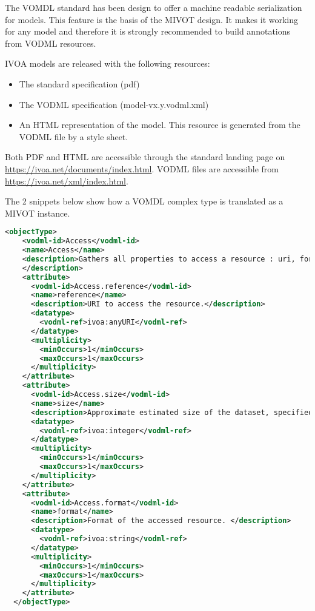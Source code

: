 The VOMDL standard has been design to offer a machine readable serialization for models. 
This feature is the basis of the MIVOT design. 
It makes it working for any model
and therefore it is strongly recommended to build annotations from VODML resources.

IVOA models are released with the following resources:
\begin{itemize}
    \item The standard specification (pdf)
    \item The VODML specification (model-vx.y.vodml.xml)
    \item An HTML representation of the model. 
          This resource is generated from the VODML file by a style sheet.    
\end{itemize}

Both PDF and HTML are accessible through the standard landing page
on \url{https://ivoa.net/documents/index.html}.
VODML files are accessible from \url{https://ivoa.net/xml/index.html}.

The 2 snippets below show how a VOMDL complex type is translated as a MIVOT instance.

\begin{lstlisting}[caption={VODML representation of the PhotDM class \texttt{Access}.
This is an object type with 3 attributes, each with a cardinality equal  to 1. 
At this stage, we do not know whether attributes are typed with a complex types 
or primitive types. This will come later by getting through their own types.},language=XML]
  <objectType>
    <vodml-id>Access</vodml-id>
    <name>Access</name>
    <description>Gathers all properties to access a resource : uri, format and size . 
    </description>
    <attribute>
      <vodml-id>Access.reference</vodml-id>
      <name>reference</name>
      <description>URI to access the resource.</description>
      <datatype>
        <vodml-ref>ivoa:anyURI</vodml-ref>
      </datatype>
      <multiplicity>
        <minOccurs>1</minOccurs>
        <maxOccurs>1</maxOccurs>
      </multiplicity>
    </attribute>
    <attribute>
      <vodml-id>Access.size</vodml-id>
      <name>size</name>
      <description>Approximate estimated size of the dataset, specified in kilobytes.</description>
      <datatype>
        <vodml-ref>ivoa:integer</vodml-ref>
      </datatype>
      <multiplicity>
        <minOccurs>1</minOccurs>
        <maxOccurs>1</maxOccurs>
      </multiplicity>
    </attribute>
    <attribute>
      <vodml-id>Access.format</vodml-id>
      <name>format</name>
      <description>Format of the accessed resource. </description>
      <datatype>
        <vodml-ref>ivoa:string</vodml-ref>
      </datatype>
      <multiplicity>
        <minOccurs>1</minOccurs>
        <maxOccurs>1</maxOccurs>
      </multiplicity>
    </attribute>
  </objectType>
\end{lstlisting}  

